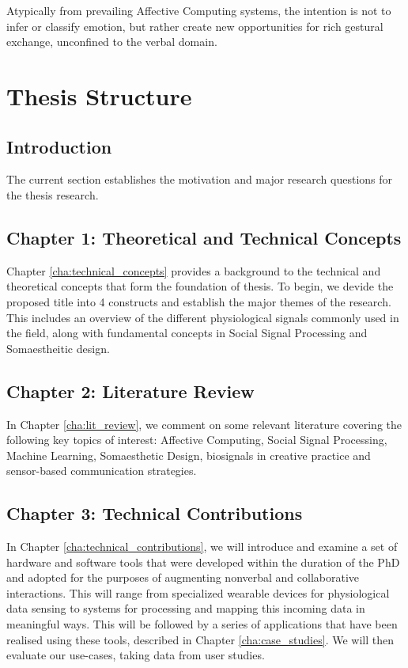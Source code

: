 Atypically from prevailing Affective Computing systems, the intention is not to infer or classify emotion, but rather create new opportunities for rich gestural exchange, unconfined to the verbal domain.

\section{Thesis Structure} %
\label{sec:structure}

\subsection{Introduction}
The current section establishes the motivation and major research questions for the thesis research.

\subsection{Chapter 1: Theoretical and Technical Concepts}

Chapter \ref{cha:technical_concepts} provides a background to the technical and theoretical concepts that form the foundation of thesis. To begin, we devide the proposed title into 4 constructs and establish the major themes of the research. This includes an overview of the different physiological signals commonly used in the field, along with fundamental concepts in Social Signal Processing and Somaestheitic design.

\subsection{Chapter 2: Literature Review}

In Chapter \ref{cha:lit_review}, we comment on some relevant literature covering the following key topics of interest: Affective Computing, Social Signal Processing, Machine Learning, Somaesthetic Design, biosignals in creative practice and sensor-based communication strategies.

\subsection{Chapter 3: Technical Contributions}

In Chapter \ref{cha:technical_contributions}, we will introduce and examine a set of hardware and software tools that were developed within the duration of the PhD and adopted for the purposes of augmenting nonverbal and collaborative interactions. This will range from specialized wearable devices for physiological data sensing to systems for processing and mapping this incoming data in meaningful ways. This will be followed by a series of applications that have been realised using these tools, described in Chapter \ref{cha:case_studies}. We will then evaluate our use-cases, taking data from user studies.  

